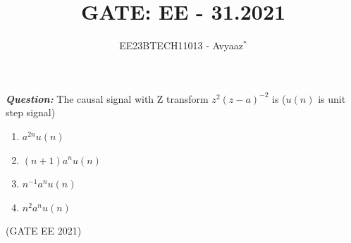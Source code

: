 \documentclass[journal,12pt,twocolumn]{IEEEtran}
\theoremstyle{remark}
\begin{document}

\vspace{3cm}

\title{GATE: EE - 31.2021}
\author{EE23BTECH11013 - Avyaaz$^{*}$%
}
\maketitle
\newpage
\bigskip

\renewcommand{\thefigure}{\arabic{figure}}
\renewcommand{\thetable}{\arabic{table}}

\large\textbf{\textsl{Question:}}
The causal signal with Z transform $z^2(z - a)^{-2}$ is ($u(n)$ is unit step signal)
\begin{enumerate}
    \item $a^{2n}u(n)$
    \item $(n + 1)a^nu(n)$
    \item $n^{-1}a^nu(n)$
    \item $n^2a^nu(n)$
\end{enumerate}

\hfill(GATE EE 2021) \\
\solution
\fi
%      

\end{document}
